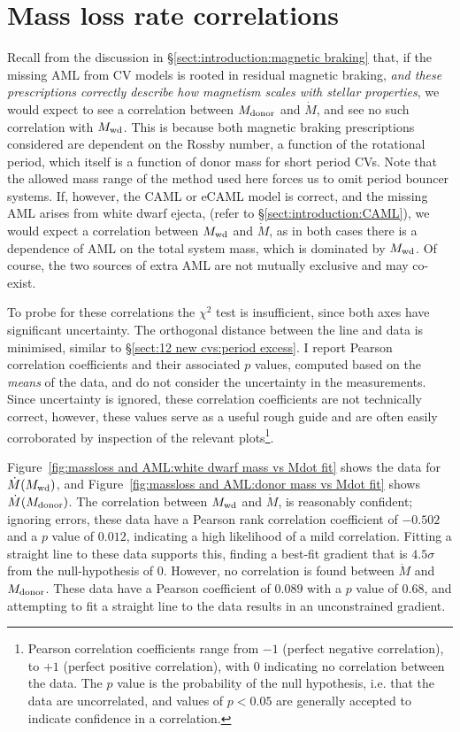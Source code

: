 \newpage
\section{Mass loss rate correlations}
\label{sect:massloss and AML:mass loss rate correlations}

Recall from the discussion in \S\ref{sect:introduction:magnetic braking} that, if the missing AML from CV models is rooted in residual magnetic braking, \textit{and these prescriptions correctly describe how magnetism scales with stellar properties}, we would expect to see a correlation between $M_{\rm donor}$ and $\dot M$, and see no such correlation with $M_{\rm wd}$.
This is because both magnetic braking prescriptions considered are dependent on the Rossby number, a function of the rotational period, which itself is a function of donor mass for short period CVs. Note that the allowed mass range of the method used here forces us to omit period bouncer systems.
If, however, the CAML or eCAML model is correct, and the missing AML arises from white dwarf ejecta, (refer to \S\ref{sect:introduction:CAML}), we would expect a correlation between $M_{\rm wd}$ and $\dot M$, as in both cases there is a dependence of AML on the total system mass, which is dominated by $M_{\rm wd}$.
Of course, the two sources of extra AML are not mutually exclusive and may co-exist.

To probe for these correlations the $\chi^2$ test is insufficient, since both axes have significant uncertainty. The orthogonal distance between the line and data is minimised, similar to \S\ref{sect:12 new cvs:period excess}.
I report Pearson correlation coefficients and their associated $p$ values, computed based on the \textit{means} of the data, and do not consider the uncertainty in the measurements. Since uncertainty is ignored, these correlation coefficients are not technically correct, however, these values serve as a useful rough guide and are often easily corroborated by inspection of the relevant plots\footnote{Pearson correlation coefficients range from $-1$ (perfect negative correlation), to $+1$ (perfect positive correlation), with 0 indicating no correlation between the data. The $p$ value is the probability of the null hypothesis, i.e. that the data are uncorrelated, and values of $p < 0.05$ are generally accepted to indicate confidence in a correlation.}.

Figure~\ref{fig:massloss and AML:white dwarf mass vs Mdot fit} shows the data for $\dot M(M_{\rm wd})$, and Figure~\ref{fig:massloss and AML:donor mass vs Mdot fit} shows $\dot M(M_{\rm donor})$.
The correlation between $M_{\rm wd}$ and $\dot M$, is reasonably confident; ignoring errors, these data have a Pearson rank correlation coefficient of $-0.502$ and a $p$ value of $0.012$, indicating a high likelihood of a mild correlation. Fitting a straight line to these data supports this, finding a best-fit gradient that is $4.5\sigma$ from the null-hypothesis of 0.
However, no correlation is found between $\dot M$ and $M_{\rm donor}$. These data have a Pearson coefficient of $0.089$ with a $p$ value of $0.68$, and attempting to fit a straight line to the data results in an unconstrained gradient.

